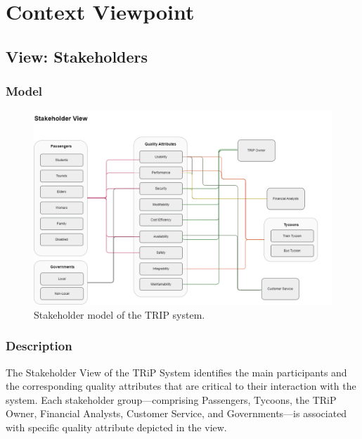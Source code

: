\section{Context Viewpoint}

\subsection{View: Stakeholders}

\subsubsection{Model}
\begin{figure}[H]
    \centering
    \includegraphics[width=\textwidth]{drawings/views_final_version/stakeholder_view.png}
    \caption{Stakeholder model of the TRIP system.}
    \label{fig:stakeholder_view_model}
\end{figure}

\subsubsection{Description}
The Stakeholder View of the TRiP System identifies the main participants and the corresponding quality attributes that are critical to their interaction with the system. Each stakeholder group—comprising Passengers, Tycoons, the TRiP Owner, Financial Analysts, Customer Service, and Governments—is associated with specific quality attribute depicted in the view.
